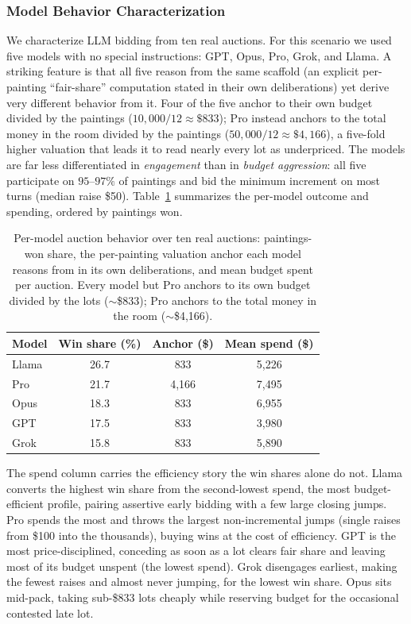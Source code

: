 \documentclass[conference]{IEEEtran}
\begin{document}
\subsubsection{Model Behavior Characterization}
We characterize LLM bidding from ten real auctions. For this scenario we used five models with no special instructions: GPT, Opus, Pro, Grok, and Llama. A striking feature is that all five reason from the same scaffold (an explicit per-painting ``fair-share'' computation stated in their own deliberations) yet derive very different behavior from it. Four of the five anchor to their own budget divided by the paintings ($10{,}000/12 \approx \$833$); Pro instead anchors to the total money in the room divided by the paintings ($50{,}000/12 \approx \$4{,}166$), a five-fold higher valuation that leads it to read nearly every lot as underpriced. The models are far less differentiated in \emph{engagement} than in \emph{budget aggression}: all five participate on $95$--$97\%$ of paintings and bid the minimum increment on most turns (median raise \$50). Table~\ref{tab:auction_behavior} summarizes the per-model outcome and spending, ordered by paintings won.

\begin{table}[htbp]
\caption{Per-model auction behavior over ten real auctions: paintings-won share, the per-painting valuation anchor each model reasons from in its own deliberations, and mean budget spent per auction. Every model but Pro anchors to its own budget divided by the lots ($\sim$\$833); Pro anchors to the total money in the room ($\sim$\$4{,}166).}
\label{tab:auction_behavior}
\centering
\begin{tabular}{lccc}
\hline
Model & Win share (\%) & Anchor (\$) & Mean spend (\$) \\
\hline
Llama & 26.7 & 833   & 5{,}226 \\
Pro   & 21.7 & 4{,}166 & 7{,}495 \\
Opus  & 18.3 & 833   & 6{,}955 \\
GPT   & 17.5 & 833   & 3{,}980 \\
Grok  & 15.8 & 833   & 5{,}890 \\
\hline
\end{tabular}
\end{table}

The spend column carries the efficiency story the win shares alone do not. Llama converts the highest win share from the second-lowest spend, the most budget-efficient profile, pairing assertive early bidding with a few large closing jumps. Pro spends the most and throws the largest non-incremental jumps (single raises from \$100 into the thousands), buying wins at the cost of efficiency. GPT is the most price-disciplined, conceding as soon as a lot clears fair share and leaving most of its budget unspent (the lowest spend). Grok disengages earliest, making the fewest raises and almost never jumping, for the lowest win share. Opus sits mid-pack, taking sub-\$833 lots cheaply while reserving budget for the occasional contested late lot.
\end{document}
